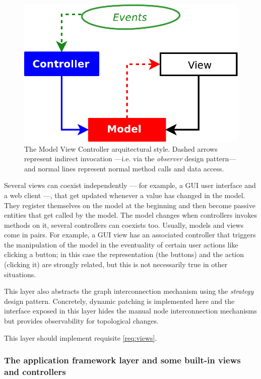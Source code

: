 \begin{figure}[h!] \centering
\includegraphics[width=.7\textwidth]{pic/mvc.pdf}

\caption[The MVC architectural style]{The Model View Controller
  arquitectural style. Dashed arrows represent indirect invocation
  ---i.e. via the \emph{observer} design pattern--- and normal lines
  represent normal method calls and data access.}
\label{fig:mvc}
\end{figure}

Several views can coexist independently --- for
example, a GUI user interface and a web client ---, that get updated
whenever a value has changed in the model. They register themselves on
the model at the beginning and then become passive entities that get
called by the model. The model changes when controllers invokes
methods on it, several controllers can
coexists too. Usually, models and views come in pairs. For example, a
GUI view has an associated controller that triggers the manipulation
of the model in the eventuality of certain user actions like clicking
a button; in this case the representation (the buttons) and the action
(clicking it) are strongly related, but this is not necessarily true
in other situations.

This layer also abstracts the graph interconnection mechanism using
the \emph{strategy} design pattern. Concretely, dynamic patching is implemented here and the
interface exposed in this layer hides the manual node interconnection
mechanisms but provides observability for topological changes.

This layer should implement requisite \ref{req:views}. 

\subsubsection{The application framework layer and some built-in views
  and controllers}

